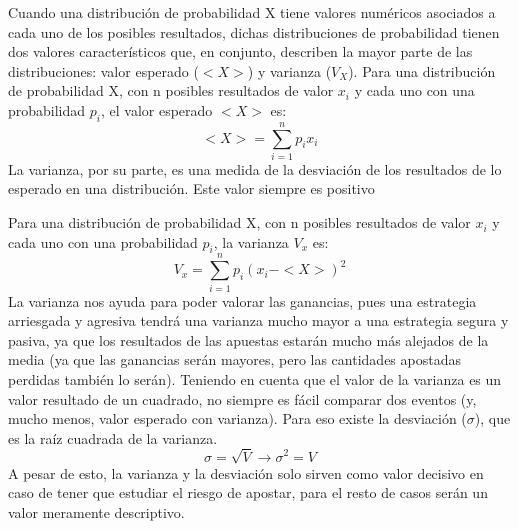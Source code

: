 Cuando una distribución de probabilidad X tiene valores numéricos asociados a cada uno de los posibles resultados, dichas distribuciones de probabilidad tienen dos valores característicos que, en conjunto, describen la mayor parte de las distribuciones: valor esperado ($<X>$) y varianza ($V_X$).
Para una distribución de probabilidad X, con n posibles resultados de valor $x_i$ y cada uno con una probabilidad $p_i$, el valor esperado $<X>$ es: 
\[
<X> =\sum_{i=1}^ n p_ix_i
\]
La varianza, por su parte, es una medida de la desviación de los resultados de lo esperado en una distribución. Este valor siempre es positivo


Para una distribución de probabilidad X, con n posibles resultados de valor $x_i$ y cada uno con una probabilidad $p_i$, la varianza $V_x$ es: 
\[
V_x= \sum_{i=1}^ n p_i(x_i - <X>)^2
\]
La varianza nos ayuda para poder valorar las ganancias, pues una estrategia arriesgada y agresiva tendrá una varianza mucho mayor a una estrategia segura y pasiva, ya que los resultados de las apuestas estarán mucho más alejados de la media (ya que las ganancias serán mayores, pero las cantidades apostadas perdidas también lo serán). 
Teniendo en cuenta que el valor de la varianza es un valor resultado de un cuadrado, no siempre es fácil comparar dos eventos (y, mucho menos, valor esperado con varianza). Para eso existe la desviación ($\sigma$), que es la raíz cuadrada de la varianza.
\[
	\sigma =\sqrt{V}  \rightarrow \sigma^2= V
\]
A pesar de esto, la varianza y la desviación solo sirven como valor decisivo en caso de tener que estudiar el riesgo de apostar, para el resto de casos serán un valor meramente descriptivo.
